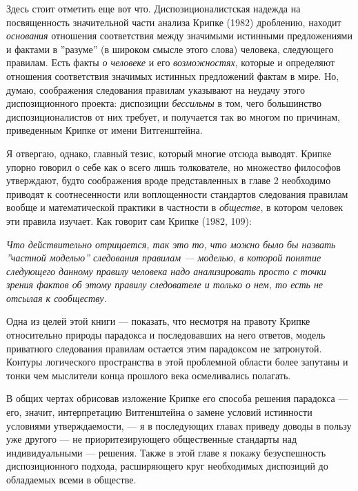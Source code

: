 \documentclass[11pt]{book}
\begin{document}
Здесь стоит отметить еще вот что. Диспозиционалистская надежда на посвященность значительной части анализа Крипке (1982) дроблению, находит \textit{основания} отношения соответствия между значимыми истинными предложениями и фактами в ''разуме'' (в широком смысле этого слова) человека, следующего правилам. Есть факты \textit{о человеке} и его \textit{возможностях}, которые и определяют отношения соответствия значимых истинных предложений фактам в мире. Но, думаю, соображения следования правилам указывают на неудачу этого диспозиционного проекта: диспозиции \textit{бессильны} в том, чего большинство диспозиционалистов от них требует, и получается так во многом по причинам, приведенным Крипке от имени Витгенштейна.

Я отвергаю, однако, главный тезис, который многие отсюда выводят. Крипке упорно говорил о себе как о всего лишь толкователе, но множество философов утверждают, будто соображения вроде представленных в главе 2 необходимо приводят к соотнесенности или воплощенности стандартов следования правилам вообще и математической практики в частности в \textit{обществе}, в котором человек эти правила изучает. Как говорит сам Крипке (1982, 109):

\smallskip

\textit{Что действительно отрицается, так это то, что можно было бы назвать ''частной моделью'' следования правилам --- моделью, в которой понятие следующего данному правилу человека надо анализировать просто с точки зрения фактов об этому правилу следователе и только о нем, то есть не отсылая к сообществу.}

\smallskip

Одна из целей этой книги --- показать, что несмотря на правоту Крипке относительно природы парадокса и последовавших на него ответов, модель приватного следования правилам остается этим парадоксом не затронутой. Контуры логического пространства в этой проблемной области более запутаны и тонки чем мыслители конца прошлого века осмеливались полагать.

В общих чертах обрисовав изложение Крипке его способа решения парадокса --- его, значит, интерпретацию Витгенштейна о замене условий истинности условиями утверждаемости, --- я в последующих главах приведу доводы в пользу уже другого --- не приоритезирующего общественные стандарты над индивидуальными --- решения. Также в этой главе я покажу безуспешность диспозиционного подхода, расширяющего круг необходимых диспозиций до обладаемых всеми в обществе.
\end{document}
